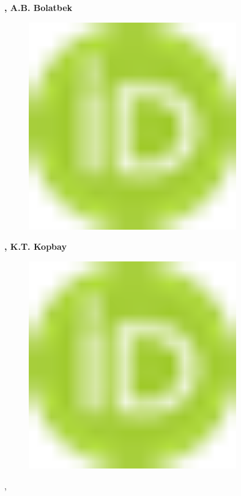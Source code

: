 {\bfseries , A.B.
Bolatbek}
\begin{figure}[H]
	\centering
	\includegraphics[width=0.8\textwidth]{media/ict/image16}
	\caption*{}
\end{figure}
{\bfseries ,
K.T.
Kopbay}
\begin{figure}[H]
	\centering
	\includegraphics[width=0.8\textwidth]{media/ict/image16}
	\caption*{}
\end{figure}
,

